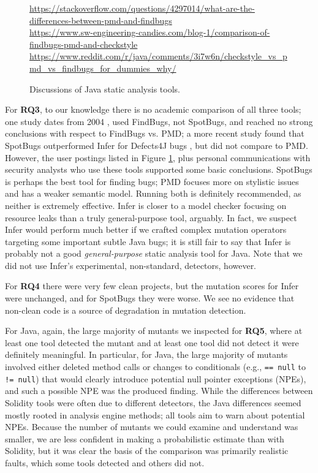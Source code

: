 \begin{figure}
  {\scriptsize
    \raggedright    
  \url{https://stackoverflow.com/questions/4297014/what-are-the-differences-between-pmd-and-findbugs} \\
  \url{https://www.sw-engineering-candies.com/blog-1/comparison-of-findbugs-pmd-and-checkstyle} \\
  \url{https://www.reddit.com/r/java/comments/3i7w6n/checkstyle_vs_pmd_vs_findbugs_for_dummies_why/} \\
  }
\caption{Discussions of Java static analysis tools.}
\label{fig:blog}
\end{figure}

For {\bf RQ3}, to our knowledge there is no academic comparison of all three tools; one study dates from 2004 \cite{CompareJavaTools}, used FindBugs, not SpotBugs, and reached no strong conclusions with respect to FindBugs vs. PMD; a more recent study found that SpotBugs outperformed Infer for Defects4J \cite{just2014defects4j} bugs \cite{AllBugs}, but did not compare to PMD.  However, the user postings listed in Figure \ref{fig:blog}, plus personal communications with security analysts who use these tools \cite{personalJava} supported some basic conclusions.  SpotBugs is perhaps the best tool for finding bugs; PMD focuses more on stylistic issues and has a weaker semantic model.  Running both is definitely recommended, as neither is extremely effective.  Infer is closer to a model checker focusing on resource leaks than a truly general-purpose tool, arguably.  In fact, we suspect Infer would perform much better if we crafted complex mutation operators targeting some important subtle Java bugs; it is still fair to say that Infer is probably not a good \emph{general-purpose} static analysis tool for Java.  Note that we did not use Infer's experimental, non-standard, detectors, however.

For {\bf RQ4} there were very few clean projects, but the mutation scores for Infer were unchanged, and for SpotBugs they were worse.  We see no evidence that non-clean code is a source of degradation in mutation detection.

For Java, again, the large majority of mutants we inspected for {\bf RQ5}, where at least one tool detected the mutant and at least one tool did not detect it were definitely meaningful.  In particular, for Java, the large majority of mutants involved either deleted method calls or changes to conditionals (e.g., {\tt == null} to {\tt != null}) that would clearly introduce potential null pointer exceptions (NPEs), and such a possible NPE was the produced finding.  While the differences between Solidity tools were often due to different detectors, the Java differences seemed mostly rooted in analysis engine methods; all tools aim to warn about potential NPEs.  Because the number of mutants we could examine and understand was smaller, we are less confident in making a probabilistic estimate than with Solidity, but it was clear the basis of the comparison was primarily realistic faults, which some tools detected and others did not.

